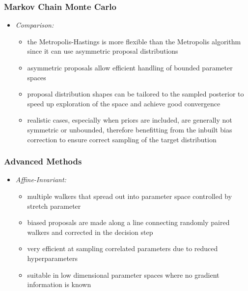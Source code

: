 	\begin{frame}[noframenumbering]
		\frametitle{Markov Chain Monte Carlo}
		\begin{itemize}
			\item<2-> \itshape{Comparison:}
			\begin{itemize}
				\item<3-> the Metropolis-Hastings is more flexible than the Metropolis algorithm since it can use asymmetric proposal distributions
				\item<4-> asymmetric proposals allow efficient handling of bounded parameter spaces
				\item<5-> proposal distribution shapes can be tailored to the sampled posterior to speed up exploration of the space and achieve
						  good convergence
				\item<6-> realistic cases, especially when priors are included, are generally not symmetric or unbounded, therefore benefitting from
						  the inbuilt bias correction to ensure correct sampling of the target distribution
			\end{itemize}
		\end{itemize}
	\end{frame}
	
	\begin{frame}
		\frametitle{Advanced Methods}
		\begin{itemize}
			\item<2-> \itshape{Affine-Invariant:}
			\begin{itemize}
				\item<3-> multiple walkers that spread out into parameter space controlled by stretch parameter
				\item<4-> biased proposals are made along a line connecting randomly paired walkers and corrected in the decision step
				\item<5-> very efficient at sampling correlated parameters due to reduced hyperparameters
				\item<6-> suitable in low dimensional parameter spaces where no gradient information is known
			\end{itemize}
		\end{itemize}
	\end{frame}
	
